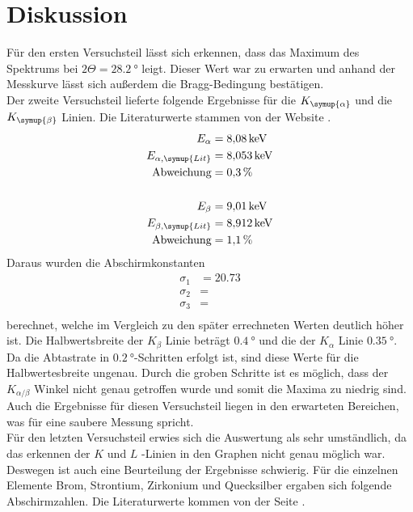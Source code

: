 \section{Diskussion}
\label{sec:Diskussion}

Für den ersten Versuchsteil lässt sich erkennen, dass das Maximum des Spektrums
bei $2 \Theta = \SI{28.2}{\degree}$ leigt. Dieser Wert war zu erwarten und anhand der
Messkurve lässt sich außerdem die Bragg-Bedingung bestätigen.\\
Der zweite Versuchsteil lieferte folgende Ergebnisse für die $K_\symup{\alpha}$ und
die $K_\symup{\beta}$ Linien. Die Literaturwerte stammen von der Website \cite{alpha}.\\
\begin{align*}
  E_\alpha &= \SI{8.08}{\kilo\eV}\\
  E_{\alpha,\symup{Lit}} &= \SI{8.053}{\kilo\eV}\\
  \text{Abweichung} &= \SI{0.3}{\percent}\\\\
  E_\beta &= \SI{9.01}{\kilo\eV}\\
  E_{\beta,\symup{Lit}} &= \SI{8.912}{\kilo\eV}\\
  \text{Abweichung} &= \SI{1.1}{\percent}\\
\end{align*}
Daraus wurden die Abschirmkonstanten
\begin{align*}
  \sigma_1 &= \num{20.73}\\
  \sigma_2 &= \num{}\\
  \sigma_3 &= \num{}\\
\end{align*}
berechnet, welche im Vergleich zu den später errechneten Werten deutlich höher ist. Die
Halbwertsbreite der $K_\beta$ Linie beträgt $\SI{0.4}{\degree}$ und die der
$K_\alpha$ Linie $\SI{0.35}{\degree}$. Da die Abtastrate in $\SI{0.2}{\degree}$-Schritten erfolgt
ist, sind diese Werte für die Halbwertesbreite ungenau. Durch die groben Schritte ist es möglich,
dass der
$K_{\alpha/\beta}$ Winkel nicht genau getroffen wurde und somit die Maxima zu niedrig sind.\\
Auch die Ergebnisse für diesen Versuchsteil liegen in den erwarteten Bereichen,
was für eine saubere Messung spricht.\\
Für den letzten Versuchsteil erwies sich die Auswertung als sehr umständlich, da
das erkennen der $K$ und $L$ -Linien in den Graphen nicht genau möglich war. Deswegen
ist auch eine Beurteilung der Ergebnisse schwierig. Für die einzelnen
Elemente Brom, Strontium, Zirkonium und Quecksilber ergaben sich folgende
Abschirmzahlen. Die Literaturwerte kommen von der Seite \cite{k_edge}.

